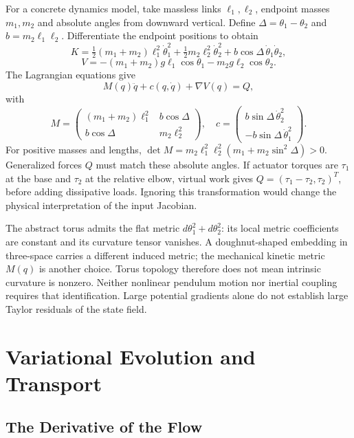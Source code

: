 For a concrete dynamics model, take massless links $\ell_1,\ell_2$, endpoint masses $m_1,m_2$
and absolute angles from downward vertical. Define $\Delta=\theta_1-\theta_2$ and
$b=m_2\ell_1\ell_2$. Differentiate the endpoint positions to obtain
\[
K=\tfrac12(m_1+m_2)\ell_1^2\dot\theta_1^2
+\tfrac12m_2\ell_2^2\dot\theta_2^2+b\cos\Delta\,\dot\theta_1\dot\theta_2,
\]
\[
V=-(m_1+m_2)g\ell_1\cos\theta_1-m_2g\ell_2\cos\theta_2.
\]
The Lagrangian equations give
\begin{equation}
M(q)\ddot q+c(q,\dot q)+\nabla V(q)=Q,
\label{eq:ch1:double-pend-dyn}
\end{equation}
with
\[
M=\begin{pmatrix}(m_1+m_2)\ell_1^2&b\cos\Delta\\b\cos\Delta&m_2\ell_2^2\end{pmatrix},
\quad c=\begin{pmatrix}b\sin\Delta\,\dot\theta_2^2\\-b\sin\Delta\,\dot\theta_1^2\end{pmatrix}.
\]
For positive masses and lengths,
$\det M=m_2\ell_1^2\ell_2^2(m_1+m_2\sin^2\Delta)>0$.
Generalized forces $Q$ must match these absolute angles. If actuator torques are $\tau_1$
at the base and $\tau_2$ at the relative elbow, virtual work gives
$Q=(\tau_1-\tau_2,\tau_2)^T$, before adding dissipative loads. Ignoring this transformation
would change the physical interpretation of the input Jacobian.

The abstract torus admits the flat metric $d\theta_1^2+d\theta_2^2$: its local metric
coefficients are constant and its curvature tensor vanishes. A doughnut-shaped embedding
in three-space carries a different induced metric; the mechanical kinetic metric $M(q)$
is another choice. Torus topology therefore does not mean intrinsic curvature is nonzero.
Neither nonlinear pendulum motion nor inertial coupling requires that identification.
Large potential gradients alone do not establish large Taylor residuals of the state field.

\section{Variational Evolution and Transport}
\label{sec:transport}

\subsection{The Derivative of the Flow}

